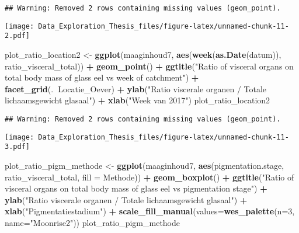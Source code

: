\documentclass[]{article}
\newenvironment{Shaded}{\begin{snugshade}}{\end{snugshade}}
\newcommand{\KeywordTok}[1]{\textcolor[rgb]{0.13,0.29,0.53}{\textbf{#1}}}
\newcommand{\DataTypeTok}[1]{\textcolor[rgb]{0.13,0.29,0.53}{#1}}
\newcommand{\DecValTok}[1]{\textcolor[rgb]{0.00,0.00,0.81}{#1}}
\newcommand{\StringTok}[1]{\textcolor[rgb]{0.31,0.60,0.02}{#1}}
\newcommand{\OperatorTok}[1]{\textcolor[rgb]{0.81,0.36,0.00}{\textbf{#1}}}
\newcommand{\NormalTok}[1]{#1}
\begin{document}
\begin{verbatim}
## Warning: Removed 2 rows containing missing values (geom_point).
\end{verbatim}

\texttt{[image: Data\_Exploration\_Thesis\_files/figure-latex/unnamed-chunk-11-2.pdf]}

\begin{Shaded}
\begin{Highlighting}[]
\NormalTok{plot_ratio_location2 <-}\StringTok{ }\KeywordTok{ggplot}\NormalTok{(maaginhoud7, }\KeywordTok{aes}\NormalTok{(}\KeywordTok{week}\NormalTok{(}\KeywordTok{as.Date}\NormalTok{(datum)), ratio_visceral_total)) }\OperatorTok{+}
\StringTok{  }\KeywordTok{geom_point}\NormalTok{() }\OperatorTok{+}
\StringTok{  }\KeywordTok{ggtitle}\NormalTok{(}\StringTok{"Ratio of visceral organs on total body mass of glass eel vs week of catchment"}\NormalTok{) }\OperatorTok{+}
\StringTok{  }\KeywordTok{facet_grid}\NormalTok{(.}\OperatorTok{~}\NormalTok{Locatie_Oever) }\OperatorTok{+}
\StringTok{  }\KeywordTok{ylab}\NormalTok{(}\StringTok{"Ratio viscerale organen / Totale lichaamsgewicht glasaal"}\NormalTok{) }\OperatorTok{+}
\StringTok{  }\KeywordTok{xlab}\NormalTok{(}\StringTok{"Week van 2017"}\NormalTok{)}
\NormalTok{plot_ratio_location2}
\end{Highlighting}
\end{Shaded}

\begin{verbatim}
## Warning: Removed 2 rows containing missing values (geom_point).
\end{verbatim}

\texttt{[image: Data\_Exploration\_Thesis\_files/figure-latex/unnamed-chunk-11-3.pdf]}

\begin{Shaded}
\begin{Highlighting}[]
\NormalTok{plot_ratio_pigm_methode <-}\StringTok{ }\KeywordTok{ggplot}\NormalTok{(maaginhoud7, }\KeywordTok{aes}\NormalTok{(pigmentation.stage, ratio_visceral_total, }\DataTypeTok{fill =}\NormalTok{ Methode)) }\OperatorTok{+}
\StringTok{  }\KeywordTok{geom_boxplot}\NormalTok{() }\OperatorTok{+}
\StringTok{  }\KeywordTok{ggtitle}\NormalTok{(}\StringTok{"Ratio of visceral organs on total body mass of glass eel vs pigmentation stage"}\NormalTok{) }\OperatorTok{+}
\StringTok{  }\KeywordTok{ylab}\NormalTok{(}\StringTok{"Ratio viscerale organen / Totale lichaamsgewicht glasaal"}\NormalTok{) }\OperatorTok{+}
\StringTok{  }\KeywordTok{xlab}\NormalTok{(}\StringTok{"Pigmentatiestadium"}\NormalTok{) }\OperatorTok{+}
\StringTok{  }\KeywordTok{scale_fill_manual}\NormalTok{(}\DataTypeTok{values=}\KeywordTok{wes_palette}\NormalTok{(}\DataTypeTok{n=}\DecValTok{3}\NormalTok{, }\DataTypeTok{name=}\StringTok{"Moonrise2"}\NormalTok{))  }
\NormalTok{plot_ratio_pigm_methode}
\end{Highlighting}
\end{Shaded}
\end{document}

